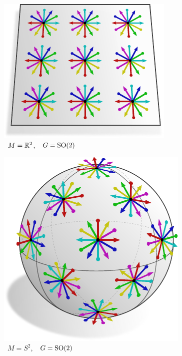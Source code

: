 \\[2ex]
% 
% 
% 
% 
\begin{subfigure}[b]{0.26\textwidth}
    \centering
    \includegraphics[width=1.\textwidth]{figures/G_structure_R2_2_big.pdf}
    \captionsetup{format=hang}
    \caption{\small
        \,  $M = \mathbb{R}^2$,
        \,\ $G = \operatorname{SO}(2)$
    }
    \label{fig:G_structure_intro_g}
\end{subfigure}
\hfill
\begin{subfigure}[b]{0.26\textwidth}
    \centering
    \includegraphics[width=.95\textwidth]{figures/G_structure_S2_1.pdf}
    \vspace*{-2ex}
    \captionsetup{format=hang}
    \caption{\small
        \,  $M = S^2$,
        \,\ $G = \operatorname{SO}(2)$
    }
    \label{fig:G_structure_intro_h}
\end{subfigure}
